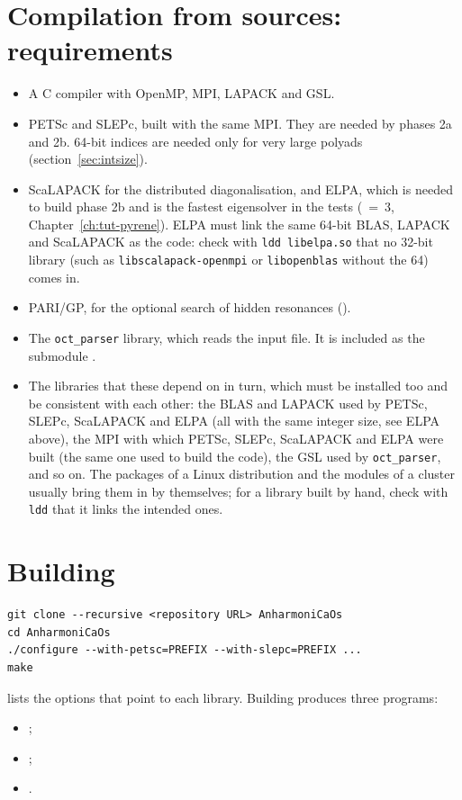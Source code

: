 \section{Compilation from sources: requirements}

\begin{itemize}
\item A C compiler with OpenMP, MPI, LAPACK and GSL.
\item PETSc and SLEPc, built with the same MPI. They are needed by phases
  2a and 2b. 64-bit indices are needed only for very large polyads
  (section~\ref{sec:intsize}).
\item ScaLAPACK for the distributed diagonalisation, and ELPA, which is needed to build phase 2b and is the fastest eigensolver in the tests (~=~3, Chapter~\ref{ch:tut-pyrene}). ELPA must link the same 64-bit BLAS, LAPACK and ScaLAPACK as the code: check with \texttt{ldd libelpa.so} that no 32-bit library (such as \texttt{libscalapack-openmpi} or \texttt{libopenblas} without the 64) comes in.
\item PARI/GP, for the optional search of hidden resonances
  ().
\item The \texttt{oct\_parser} library, which reads the input file. It is
  included as the submodule .
\item The libraries that these depend on in turn, which must be installed
  too and be consistent with each other: the BLAS and LAPACK used by PETSc,
  SLEPc, ScaLAPACK and ELPA (all with the same integer size, see ELPA above),
  the MPI with which PETSc, SLEPc, ScaLAPACK and ELPA were built (the same one
  used to build the code), the GSL used by \texttt{oct\_parser}, and so on.
  The packages of a Linux distribution and the modules of a cluster usually
  bring them in by themselves; for a library built by hand, check with
  \texttt{ldd} that it links the intended ones.
\end{itemize}

\section{Building}

\begin{lstlisting}
git clone --recursive <repository URL> AnharmoniCaOs
cd AnharmoniCaOs
./configure --with-petsc=PREFIX --with-slepc=PREFIX ...
make
\end{lstlisting}
 lists the options that point to each library.
Building produces three programs:
\begin{itemize}
\item {};
\item {};
\item {}.
\end{itemize}

